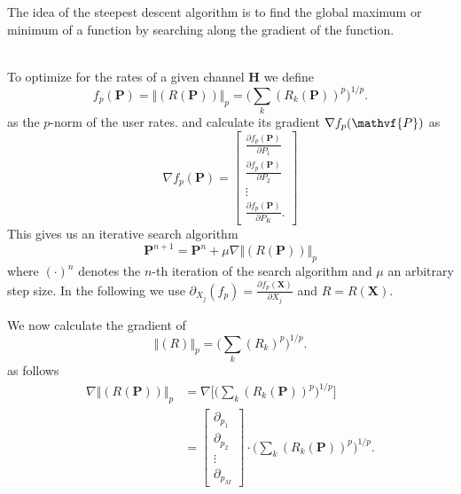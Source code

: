 The idea of the steepest descent algorithm is to find the global maximum or minimum of a function by searching along the gradient of the function.
\begin{algorithm}
\end{algorithm}\\
To optimize for the rates of a given channel $\mathbf{H}$ we define
\begin{equation}
	f_p(\mathbf{P})=\bigr\Vert{(R(\mathbf{P}))\bigl\Vert}_p = \Biggr(\sum_k{(R_k(\mathbf{P}))^p}\Biggl)^{1/p}.
\end{equation}
as the $p$-norm of the user rates. and calculate its gradient $\nabla f_p(\mathvf{P})$ as
\begin{equation}
	\nabla f_p(\mathbf{P}) =
	\begin{bmatrix}
		\frac{\partial f_p(\mathbf{P})}{\partial P_1}\\
		\frac{\partial f_p(\mathbf{P})}{\partial P_2}\\
		\vdots\\
		\frac{\partial f_p(\mathbf{P})}{\partial P_K}.
	\end{bmatrix}
\end{equation}
This gives us an iterative search algorithm
\begin{equation}
	\mathbf{P}^{n+1} = \mathbf{P}^n + \mu \nabla \bigr\Vert{(R(\mathbf{P}))\bigl\Vert}_p
\end{equation}
where $(\cdot)^n$ denotes the $n$-th iteration of the search algorithm and $\mu$ an arbitrary step size.
In the following we use $\partial_{X_j}(f_p) = \frac{\partial f_p(\mathbf{X})}{\partial X_j}$ and $R = R(\mathbf{X})$.

We now calculate the gradient of
\begin{equation}
	\bigr\Vert{(R)\bigl\Vert}_p = \Biggr(\sum_k{(R_k)^p}\Biggl)^{1/p}.
\end{equation}
as follows
\begin{align}
	\nabla \bigr\Vert{(R(\mathbf{P}))\bigl\Vert}_p &= \nabla \Biggr[ \Biggr(\sum_k{(R_k(\mathbf{P}))^p}\Biggl)^{1/p} \Biggl]\\
	&= \begin{bmatrix}
		\partial_{p_1}\\\partial_{p_2}\\\vdots\\\partial_{p_M}
	\end{bmatrix}
	\cdot \Biggr(\sum_k{(R_k(\mathbf{P}))^p}\Biggl)^{1/p}.
\end{align}

